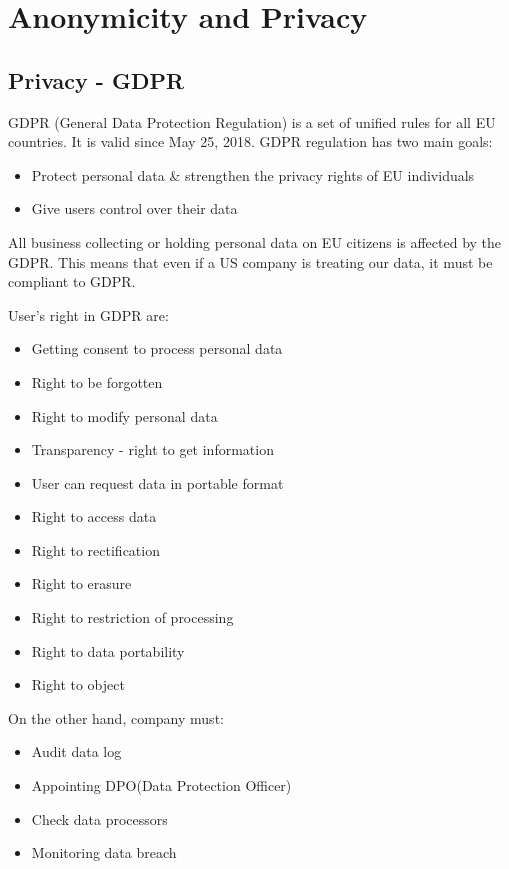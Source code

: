 \section{Anonymicity and Privacy}

\subsection{Privacy - GDPR}

GDPR (General Data Protection Regulation) is a set of unified rules for all EU countries. 
It is valid since May 25, 2018. \newline
GDPR regulation has two main goals: 
\begin{itemize}
    \item Protect personal data & strengthen the privacy rights of EU individuals
    \item Give users control over their data
\end{itemize}

All business collecting or holding personal data on EU citizens is affected by the GDPR. This means that even if a US company is treating our data, it must be compliant to GDPR.

User's right in GDPR are: 

\begin{itemize}
    \item Getting consent to process personal data
    \item Right to be forgotten
    \item Right to modify personal data
    \item Transparency - right to get information 
    \item User can request data in portable format
    \item Right to access data 
    \item Right to rectification 
    \item Right to erasure 
    \item Right to restriction of processing
    \item Right to data portability
    \item Right to object
\end{itemize}

On the other hand, company must: 

\begin{itemize}
    \item Audit data log 
    \item Appointing DPO(Data Protection Officer)
    \item Check data processors
    \item Monitoring data breach 
\end{itemize}

